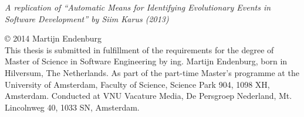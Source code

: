 \null
\vspace{10em}

\begin{center}
	\emph{A replication of ``Automatic Means for Identifying Evolutionary Events
	in Software Development'' by Siim Karus (2013)}\rm
\end{center}

\vfill

\noindent\copyright{ 2014} Martijn Endenburg\\[0.3cm]
This thesis is submitted in fulfillment of the requirements for the degree of
Master of Science in Software Engineering by ing. Martijn Endenburg, born in
Hilversum, The Netherlands. As part of the part-time Master's programme at the
University of Amsterdam, Faculty of Science, Science Park 904, 1098 XH,
Amsterdam. Conducted at VNU Vacature Media, De Persgroep Nederland, Mt.
Lincolnweg 40, 1033 SN, Amsterdam.

